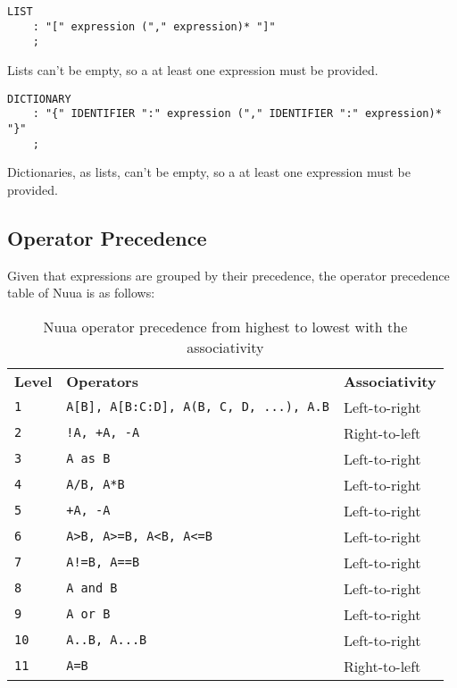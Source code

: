 \begin{lstlisting}
LIST
    : "[" expression ("," expression)* "]"
    ;
\end{lstlisting}

Lists can't be empty, so a at least one expression must be provided.

\begin{lstlisting}
DICTIONARY
    : "{" IDENTIFIER ":" expression ("," IDENTIFIER ":" expression)* "}"
    ;
\end{lstlisting}

Dictionaries, as lists, can't be empty, so a at least one expression must be provided.

\subsection{Operator Precedence}

Given that expressions are grouped by their precedence, the operator precedence table of Nuua is as follows:

\begin{table}[H]
    \centering
    \begin{tabular}{ l l l }
        \textbf{Level} & \textbf{Operators} & \textbf{Associativity} \\
        \texttt{1} & \texttt{A[B], A[B:C:D], A(B, C, D, ...), A.B} & Left-to-right \\
        \texttt{2} & \texttt{!A, +A, -A} & Right-to-left \\
        \texttt{3} & \texttt{A as B} & Left-to-right \\
        \texttt{4} & \texttt{A/B, A*B} & Left-to-right \\
        \texttt{5} & \texttt{+A, -A} & Left-to-right \\
        \texttt{6} & \texttt{A\textgreater B, A\textgreater =B, A\textless B, A\textless =B} & Left-to-right \\
        \texttt{7} & \texttt{A!=B, A==B} & Left-to-right \\
        \texttt{8} & \texttt{A and B} & Left-to-right \\
        \texttt{9} & \texttt{A or B} & Left-to-right \\
        \texttt{10} & \texttt{A..B, A...B} & Left-to-right \\
        \texttt{11} & \texttt{A=B} & Right-to-left \\
    \end{tabular}
    \caption{Nuua operator precedence from highest to lowest with the associativity}
    \label{fig:nuua_operator_precedence}
\end{table}

